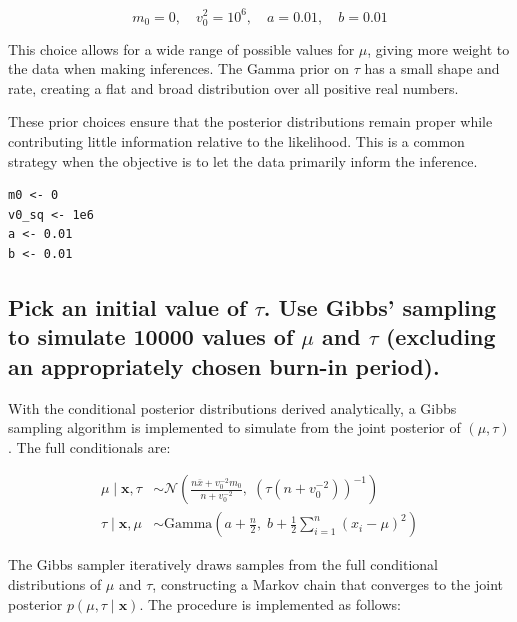 \documentclass[]{article}
\begin{document}
$$
m_0 = 0, \quad v_0^2 = 10^6, \quad a = 0.01, \quad b = 0.01
$$

This choice allows for a wide range of possible values for $\mu$, giving more weight to the data when making inferences. The Gamma prior on $\tau$ has a small shape and rate, creating a flat and broad distribution over all positive real numbers.

\noindent These prior choices ensure that the posterior distributions remain proper while contributing little information relative to the likelihood. This is a common strategy when the objective is to let the data primarily inform the inference.

\begin{lstlisting}
m0 <- 0
v0_sq <- 1e6
a <- 0.01
b <- 0.01
\end{lstlisting}




\subsection{Pick an initial value of $\tau$. Use Gibbs' sampling to simulate 10000 values of $\mu$ and $\tau$ (excluding an appropriately chosen burn-in period).}


With the conditional posterior distributions derived analytically, a Gibbs sampling algorithm is implemented to simulate from the joint posterior of $(\mu, \tau)$. The full conditionals are:

\begin{align*}
	\mu \mid \mathbf{x}, \tau &\sim \mathcal{N} \left( \frac{n \bar{x} + v_0^{-2} m_0}{n + v_0^{-2}}, \; \left( \tau(n + v_0^{-2}) \right)^{-1} \right) \\
	\tau \mid \mathbf{x}, \mu &\sim \text{Gamma} \left( a + \frac{n}{2}, \; b + \frac{1}{2} \sum_{i=1}^n (x_i - \mu)^2 \right)
\end{align*}


The Gibbs sampler iteratively draws samples from the full conditional distributions of $\mu$ and $\tau$, constructing a Markov chain that converges to the joint posterior $p(\mu, \tau \mid \mathbf{x})$. The procedure is implemented as follows:
\end{document}

